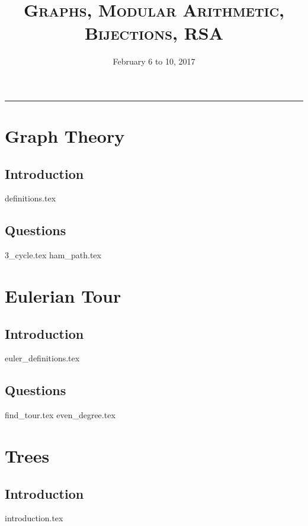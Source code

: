 \documentclass{exam}
\title{\textsc{Graphs, Modular Arithmetic, Bijections, RSA}}
\date{February 6 to 10, 2017}
\begin{document}
\maketitle
\rule{\textwidth}{0.15em}
\fontsize{12}{15}\selectfont
\thispagestyle{empty}

\section{Graph Theory}
\subsection{Introduction}
\begin{questions}
{definitions.tex}
\end{questions}

\subsection{Questions}
\begin{questions}
{3_cycle.tex}
{ham_path.tex}
\end{questions}

\section{Eulerian Tour}
\subsection{Introduction}
{euler_definitions.tex}
\subsection{Questions}
\begin{questions}
{find_tour.tex}
{even_degree.tex}
\end{questions}

\section{Trees}
\subsection{Introduction}
{introduction.tex}
\end{document}
